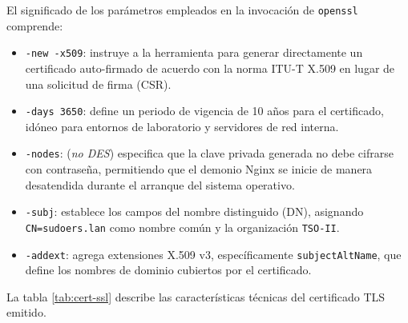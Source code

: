El significado de los parámetros empleados en la invocación de \texttt{openssl}
comprende:

\begin{itemize}
  \item \texttt{-new -x509}: instruye a la herramienta para generar directamente
        un certificado auto-firmado de acuerdo con la norma ITU-T X.509 en lugar
        de una solicitud de firma (CSR).
  \item \texttt{-days 3650}: define un periodo de vigencia de 10 años para el
        certificado, idóneo para entornos de laboratorio y servidores de red
        interna.
  \item \texttt{-nodes}: (\textit{no DES}) especifica que la clave privada generada
        no debe cifrarse con contraseña, permitiendo que el demonio Nginx se
        inicie de manera desatendida durante el arranque del sistema operativo.
  \item \texttt{-subj}: establece los campos del nombre distinguido (DN),
        asignando \texttt{CN=sudoers.lan} como nombre común y la organización
        \texttt{TSO-II}.
  \item \texttt{-addext}: agrega extensiones X.509 v3, específicamente
        \texttt{subjectAltName}, que define los nombres de dominio cubiertos
        por el certificado.
\end{itemize}

La tabla \ref{tab:cert-ssl} describe las características técnicas del
certificado TLS emitido.

\begin{table}[H]
\centering
\caption{Características del certificado SSL auto-firmado}
\label{tab:cert-ssl}
\end{table}

